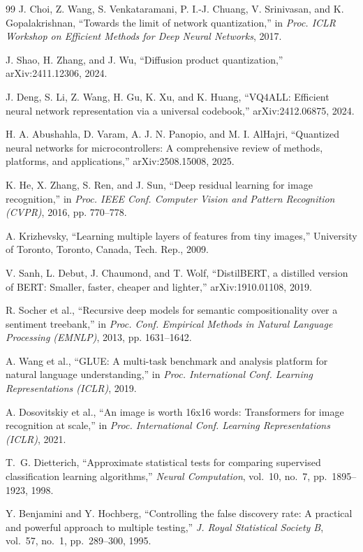 \documentclass[conference]{IEEEtran}
\begin{document}
\begin{thebibliography}{99}
J. Choi, Z. Wang, S. Venkataramani, P. I.-J. Chuang, V. Srinivasan, and K. Gopalakrishnan, ``Towards the limit of network quantization,'' in \emph{Proc. ICLR Workshop on Efficient Methods for Deep Neural Networks}, 2017.

J. Shao, H. Zhang, and J. Wu, ``Diffusion product quantization,'' arXiv:2411.12306, 2024.

J. Deng, S. Li, Z. Wang, H. Gu, K. Xu, and K. Huang, ``VQ4ALL: Efficient neural network representation via a universal codebook,'' arXiv:2412.06875, 2024.

H. A. Abushahla, D. Varam, A. J. N. Panopio, and M. I. AlHajri, ``Quantized neural networks for microcontrollers: A comprehensive review of methods, platforms, and applications,'' arXiv:2508.15008, 2025.

K. He, X. Zhang, S. Ren, and J. Sun, ``Deep residual learning for image recognition,'' in \emph{Proc. IEEE Conf. Computer Vision and Pattern Recognition (CVPR)}, 2016, pp. 770--778.

A. Krizhevsky, ``Learning multiple layers of features from tiny images,'' University of Toronto, Toronto, Canada, Tech. Rep., 2009.

V. Sanh, L. Debut, J. Chaumond, and T. Wolf, ``DistilBERT, a distilled version of BERT: Smaller, faster, cheaper and lighter,'' arXiv:1910.01108, 2019.

R. Socher et al., ``Recursive deep models for semantic compositionality over a sentiment treebank,'' in \emph{Proc. Conf. Empirical Methods in Natural Language Processing (EMNLP)}, 2013, pp. 1631--1642.

A. Wang et al., ``GLUE: A multi-task benchmark and analysis platform for natural language understanding,'' in \emph{Proc. International Conf. Learning Representations (ICLR)}, 2019.

A. Dosovitskiy et al., ``An image is worth 16x16 words: Transformers for image recognition at scale,'' in \emph{Proc. International Conf. Learning Representations (ICLR)}, 2021.

T.~G. Dietterich, ``Approximate statistical tests for comparing supervised classification learning algorithms,'' \emph{Neural Computation}, vol.~10, no.~7, pp.~1895--1923, 1998.

Y. Benjamini and Y. Hochberg, ``Controlling the false discovery rate: A practical and powerful approach to multiple testing,'' \emph{J. Royal Statistical Society B}, vol.~57, no.~1, pp.~289--300, 1995.

\end{thebibliography}
\end{document}
